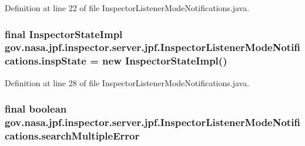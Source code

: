 Definition at line 22 of file Inspector\+Listener\+Mode\+Notifications.\+java.

\subsubsection[{\texorpdfstring{insp\+State}{inspState}}]{\setlength{\rightskip}{0pt plus 5cm}final {\bf Inspector\+State\+Impl} gov.\+nasa.\+jpf.\+inspector.\+server.\+jpf.\+Inspector\+Listener\+Mode\+Notifications.\+insp\+State = new {\bf Inspector\+State\+Impl}()\hspace{0.3cm}{\ttfamily [private]}}\hypertarget{classgov_1_1nasa_1_1jpf_1_1inspector_1_1server_1_1jpf_1_1_inspector_listener_mode_notifications_a5abe9482ab15724302ed6e929ea260ed}{}\label{classgov_1_1nasa_1_1jpf_1_1inspector_1_1server_1_1jpf_1_1_inspector_listener_mode_notifications_a5abe9482ab15724302ed6e929ea260ed}


Definition at line 28 of file Inspector\+Listener\+Mode\+Notifications.\+java.

\subsubsection[{\texorpdfstring{search\+Multiple\+Error}{searchMultipleError}}]{\setlength{\rightskip}{0pt plus 5cm}final boolean gov.\+nasa.\+jpf.\+inspector.\+server.\+jpf.\+Inspector\+Listener\+Mode\+Notifications.\+search\+Multiple\+Error\hspace{0.3cm}{\ttfamily [private]}}\hypertarget{classgov_1_1nasa_1_1jpf_1_1inspector_1_1server_1_1jpf_1_1_inspector_listener_mode_notifications_a23a71dcd80a803baf7b04038b519813c}{}\label{classgov_1_1nasa_1_1jpf_1_1inspector_1_1server_1_1jpf_1_1_inspector_listener_mode_notifications_a23a71dcd80a803baf7b04038b519813c}



